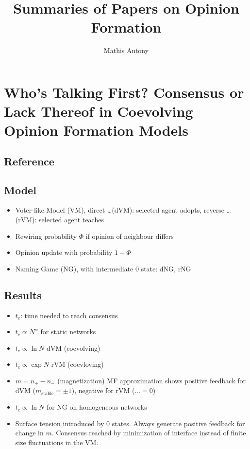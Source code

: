 \documentclass[a4paper]{scrartcl}
\begin{document}
\title{Summaries of Papers on Opinion Formation}
\author{Mathis Antony}
\maketitle
\tableofcontents
\section{Who's Talking First? Consensus or Lack Thereof in Coevolving Opinion
    Formation Models}
  \subsection{Reference}
  \subsection{Model}
    \begin{itemize}
      \item Voter-like Model (VM), direct \ldots (dVM): selected agent adopts,
        reverse \ldots (rVM): selected agent teaches
      \item Rewiring probability $\Phi$ if opinion of neighbour differs
      \item Opinion update with probability $1-\Phi$  
      \item Naming Game (NG), with intermediate 0 state: dNG, rNG
    \end{itemize}
  \subsection{Results}
    \begin{itemize}
      \item $t_c$: time needed to reach consensus
      \item $t_c \propto N^\alpha$ for static networks
      \item $t_c \propto \ln N$ dVM (coevolving)
      \item $t_c \propto \exp N$ rVM (coevloving)
      \item $m=n_+-n_-$ (magnetization) MF approximation shows positive
        feedback for dVM ($m_\textrm{stable}=\pm1$), negative for rVM
        ($\ldots=0$) 
      \item $t_c \propto \ln N$ for NG on homogeneous networks
      \item Surface tension introduced by 0 states. Always generate positive
          feedback for change in $m$. Consensus reached by minimization of
          interface instead of finite size fluctuations in the VM.
    \end{itemize}

    


\end{document}

